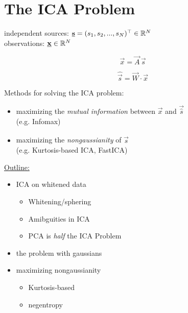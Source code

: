 
\section{The ICA Problem}
\begin{frame}

independent sources: $\underline{\mathbf{s}} = (s_1, s_2,...,s_N)^\top \in \mathbb{R}^N$\\
observations: $\underline{\mathbf{x}} \in \mathbb{R}^N$

\begin{equation}
\label{eq:ica}
\vec x = \vec A \, \vec s
\end{equation}

\begin{equation}
\widehat{\vec s} = \vec W \cdot \vec x
\end{equation}

Methods for solving the ICA problem:

\begin{itemize}
\item maximizing the \emph{mutual information} between $\vec x$ and $\vec {\hat s}$ \\
(e.g. Infomax)
\item maximizing the \emph{nongaussianity} of $\widehat {\vec s}$ \\
(e.g. Kurtosis-based ICA, FastICA)
\end{itemize}
\end{frame}

\begin{frame}
\underline{Outline:}
\begin{itemize}
    \item ICA on whitened data
    \begin{itemize}
        \item Whitening/sphering
        \item Amibguities in ICA
        \item PCA is \emph{half} the ICA Problem
    \end{itemize}
    \item the problem with gaussians
    \item maximizing nongaussianity
    \begin{itemize}
        \item Kurtosis-based
        \item negentropy
    \end{itemize}
\end{itemize}
\end{frame}

